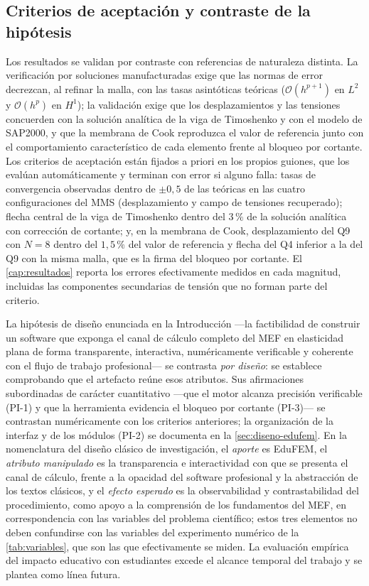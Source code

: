 \subsection{Criterios de aceptación y contraste de la hipótesis}
\label{sec:validacion-resultados}

Los resultados se validan por contraste con referencias de naturaleza distinta. La verificación por soluciones manufacturadas exige que las normas de error decrezcan, al refinar la malla, con las tasas asintóticas teóricas ($\mathcal{O}(h^{p+1})$ en $L^2$ y $\mathcal{O}(h^{p})$ en $H^1$); la validación exige que los desplazamientos y las tensiones concuerden con la solución analítica de la viga de Timoshenko y con el modelo de SAP2000, y que la membrana de Cook reproduzca el valor de referencia junto con el comportamiento característico de cada elemento frente al bloqueo por cortante. Los criterios de aceptación están fijados a priori en los propios guiones, que los evalúan automáticamente y terminan con error si alguno falla: tasas de convergencia observadas dentro de $\pm0{,}5$ de las teóricas en las cuatro configuraciones del MMS (desplazamiento y campo de tensiones recuperado); flecha central de la viga de Timoshenko dentro del $3\,\%$ de la solución analítica con corrección de cortante; y, en la membrana de Cook, desplazamiento del Q9 con $N=8$ dentro del $1{,}5\,\%$ del valor de referencia y flecha del Q4 inferior a la del Q9 con la misma malla, que es la firma del bloqueo por cortante. El \autoref{cap:resultados} reporta los errores efectivamente medidos en cada magnitud, incluidas las componentes secundarias de tensión que no forman parte del criterio.

La hipótesis de diseño enunciada en la Introducción —la factibilidad de construir un software que exponga el canal de cálculo completo del MEF en elasticidad plana de forma transparente, interactiva, numéricamente verificable y coherente con el flujo de trabajo profesional— se contrasta \emph{por diseño}: se establece comprobando que el artefacto reúne esos atributos. Sus afirmaciones subordinadas de carácter cuantitativo —que el motor alcanza precisión verificable (PI-1) y que la herramienta evidencia el bloqueo por cortante (PI-3)— se contrastan numéricamente con los criterios anteriores; la organización de la interfaz y de los módulos (PI-2) se documenta en la \autoref{sec:diseno-edufem}. En la nomenclatura del diseño clásico de investigación, el \emph{aporte} es EduFEM, el \emph{atributo manipulado} es la transparencia e interactividad con que se presenta el canal de cálculo, frente a la opacidad del software profesional y la abstracción de los textos clásicos, y el \emph{efecto esperado} es la observabilidad y contrastabilidad del procedimiento, como apoyo a la comprensión de los fundamentos del MEF, en correspondencia con las variables del problema científico; estos tres elementos no deben confundirse con las variables del experimento numérico de la \autoref{tab:variables}, que son las que efectivamente se miden. La evaluación empírica del impacto educativo con estudiantes excede el alcance temporal del trabajo y se plantea como línea futura.
